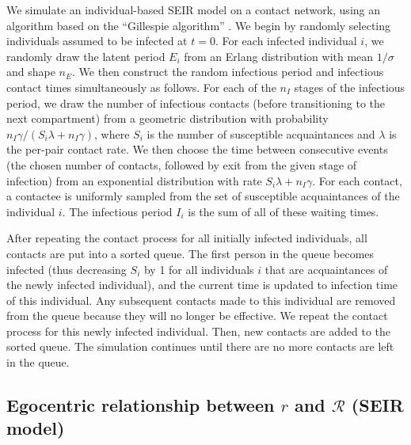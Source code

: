 \documentclass[12pt]{article}
\newcommand{\RR}{\ensuremath{{\mathcal R}}}
\begin{document}
We simulate an individual-based SEIR model on a contact network, using an algorithm based on the ``Gillespie algorithm'' \cite{bartlett1953stochastic,gillespie1977exact}.
We begin by randomly selecting individuals assumed to be infected at $t = 0$.
For each infected individual $i$, we randomly draw the latent period $E_i$ from an Erlang distribution with mean $1/\sigma$ and shape $n_E$.
We then construct the random infectious period and infectious contact times simultaneously as follows.
For each of the $n_I$ stages of the infectious period, we draw the number of infectious contacts (before transitioning to the next compartment) from a geometric distribution with probability $n_I\gamma/(S_i \lambda + n_I \gamma)$, where $S_i$ is the number of susceptible acquaintances and $\lambda$ is the per-pair contact rate.
We then choose the time between consecutive events (the chosen number of contacts, followed by exit from the given stage of infection) from an exponential distribution with rate $S_i \lambda + n_I\gamma$.
For each contact, a contactee is uniformly sampled from the set of susceptible acquaintances of the individual $i$.
The infectious period $I_i$ is the sum of all of these waiting times.

After repeating the contact process for all initially infected individuals, all contacts are put into a sorted queue.
The first person in the queue becomes infected (thus decreasing $S_i$ by 1 for all individuals $i$ that are acquaintances of the newly infected individual), and the current time is updated to infection time of this individual. 
Any subsequent contacts made to this individual are removed from the queue because they will no longer be effective.
We repeat the contact process for this newly infected individual.
Then, new contacts are added to the sorted queue.
The simulation continues until there are no more contacts are left in the queue.

\subsection{Egocentric relationship between $r$ and $\RR$ (SEIR model)}
\label{egosection}
\end{document}
